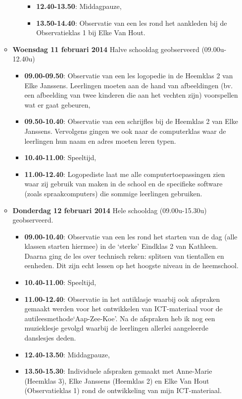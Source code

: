 \documentclass[a4paper,11pt]{article}
\theoremstyle{definition}
\begin{document}
\begin{itemize}
\begin{itemize}
\begin{itemize}
\begin{itemize}
    \item \textbf{12.40-13.50}:   Middagpauze,
    \item \textbf{13.50-14.40}:   Observatie van een les rond het aankleden bij de Observatieklas 1 bij Elke Van Hout.  \end{itemize}
 \end{itemize}
  \item \textbf{Woensdag 11 februari 2014} Halve schooldag geobserveerd (09.00u-12.40u)
   \begin{itemize}
    \item \textbf{09.00-09.50}:   Observatie van een les logopedie in de Heemklas 2 van Elke Janssens. Leerlingen moeten aan de hand 
    van afbeeldingen (bv. een afbeelding van twee kinderen die aan het vechten zijn) voorspellen wat er gaat gebeuren,
    \item \textbf{09.50-10.40}:   Observatie van een schrijfles bij de Heemklas 2 van Elke Janssens. Vervolgens gingen we ook naar de computerklas waar de leerlingen hun naam en adres moeten leren typen.  
    \item \textbf{10.40-11.00}:   Speeltijd,
    \item \textbf{11.00-12.40}:   Logopediste laat me alle computertoepassingen zien waar zij gebruik van 
    maken in de school en de specifieke software (zoals spraakcomputers) die sommige leerlingen gebruiken.
 \end{itemize}
   \item \textbf{Donderdag 12 februari 2014} Hele schooldag (09.00u-15.30u) 
  geobserveerd.
    \begin{itemize}
    \item \textbf{09.00-10.40}:   Observatie van een les rond het starten van de dag (alle klassen starten hiermee) in de  
    `sterke' Eindklas 2 van Kathleen. Daarna ging de les over technisch reken: 
    splitsen van tientallen en eenheden. Dit zijn echt lessen op het hoogste 
    niveau in de heemschool. 
    \item \textbf{10.40-11.00}:   Speeltijd,
    \item \textbf{11.00-12.40}:   Observatie in het autiklasje waarbij ook afspraken gemaakt werden voor het ontwikkelen van ICT-materiaal voor de autileesmethode`Aap-Zee-Koe'. 
    Na de afspraken heb ik nog een muzieklesje gevolgd waarbij de leerlingen 
    allerlei aangeleerde danslesjes deden.
   \item \textbf{12.40-13.50}:   Middagpauze,
    \item \textbf{13.50-15.30}:   Individuele afspraken gemaakt met Anne-Marie (Heemklas 3), Elke Janssens (Heemklas 2) en Elke Van Hout (Observatieklas 1) rond de ontwikkeling
    van mijn ICT-materiaal.
     \end{itemize}


\end{itemize}
\end{itemize}
\end{document}
